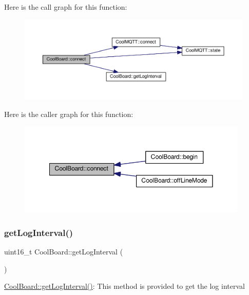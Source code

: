 Here is the call graph for this function\+:
\nopagebreak
\begin{figure}[H]
\begin{center}
\leavevmode
\includegraphics[width=350pt]{classCoolBoard_a519de78b807f8ec6463ff484eb925918_cgraph}
\end{center}
\end{figure}
Here is the caller graph for this function\+:
\nopagebreak
\begin{figure}[H]
\begin{center}
\leavevmode
\includegraphics[width=311pt]{classCoolBoard_a519de78b807f8ec6463ff484eb925918_icgraph}
\end{center}
\end{figure}
\mbox{\label{classCoolBoard_aaa24480b273fc095a1356a589c333781}} 
\subsubsection{\texorpdfstring{get\+Log\+Interval()}{getLogInterval()}}
{\footnotesize\ttfamily uint16\+\_\+t Cool\+Board\+::get\+Log\+Interval (\begin{DoxyParamCaption}{ }\end{DoxyParamCaption})}

\hyperlink{classCoolBoard_aaa24480b273fc095a1356a589c333781}{Cool\+Board\+::get\+Log\+Interval()}\+: This method is provided to get the log interval

